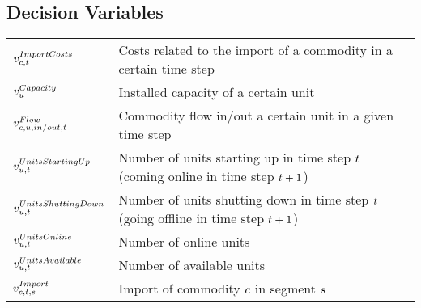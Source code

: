 \subsection*{Decision Variables}
\vspace{-1em}
	\begin{longtable}{p{\cola} p{\colc} >{\small\raggedleft\arraybackslash\itshape}p{\colb}}
		$v^{ImportCosts}_{c,t}  $	& Costs related to the import of a commodity in a certain time step	&                \\[0.5em]

		$v^{Capacity}_{u}     $	& Installed capacity of a certain unit                        	&                \\[0.5em]

		$v^{Flow}_{c,u,in/out,t}         $	& Commodity flow in/out a certain unit in a given time step   	&                \\
		$v^{UnitsStartingUp}_{u,t}$	& Number of units starting up in time step $t$ (coming online in time step $t +1$)	&                \\
		$v^{UnitsShuttingDown}_{u,t}$	& Number of units shutting down in time step $t$ (going offline in time step $t +1$)	&                \\
		$v^{UnitsOnline}_{u,t}  $	& Number of online units                                      	&                \\
		$v^{UnitsAvailable}_{u,t}$	& Number of available units                                   	&                \\
		$v^{Import}_{c,t,s}       $	& Import of commodity $c$ in segment $s$      	&                \\
	\end{longtable}

